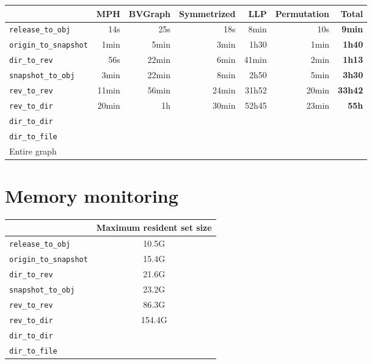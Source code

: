 \documentclass[11pt,a4paper]{article}
\begin{document}
\begin{center}
    \begin{tabular}{@{} l *6r @{}}
        \toprule
        \multicolumn{1}{c}{} &
            \textbf{MPH} &
            \textbf{BVGraph} &
            \textbf{Symmetrized} &
            \textbf{LLP} &
            \textbf{Permutation} &
            \textbf{Total} \\
        \midrule
        \texttt{release\_to\_obj}
            & 14s & 25s & 18s & 8min & 10s & \textbf{9min} \\
        \texttt{origin\_to\_snapshot}
            & 1min & 5min & 3min & 1h30 & 1min & \textbf{1h40} \\
        \texttt{dir\_to\_rev}
            & 56s & 22min & 6min & 41min & 2min & \textbf{1h13} \\
        \texttt{snapshot\_to\_obj}
            & 3min & 22min & 8min & 2h50 & 5min & \textbf{3h30} \\
        \texttt{rev\_to\_rev}
            & 11min & 56min & 24min & 31h52 & 20min & \textbf{33h42} \\
        \texttt{rev\_to\_dir}
            & 20min & 1h & 30min & 52h45 & 23min & \textbf{55h} \\
        \texttt{dir\_to\_dir}
            & & & & & & \\
        \texttt{dir\_to\_file}
            & & & & & & \\
        \midrule
        Entire graph & & & & & & \\
        \bottomrule
    \end{tabular}
\end{center}

\section{Memory monitoring}

\begin{center}
    \begin{tabular}{@{} l c @{}}
        \toprule
        \multicolumn{1}{c}{} &
            \textbf{Maximum resident set size} \\
        \midrule
        \texttt{release\_to\_obj} & 10.5G \\
        \texttt{origin\_to\_snapshot} & 15.4G \\
        \texttt{dir\_to\_rev} & 21.6G \\
        \texttt{snapshot\_to\_obj} & 23.2G \\
        \texttt{rev\_to\_rev} & 86.3G \\
        \texttt{rev\_to\_dir} & 154.4G \\
        \texttt{dir\_to\_dir} & \\
        \texttt{dir\_to\_file} & \\
        \bottomrule
    \end{tabular}
\end{center}
\end{document}
